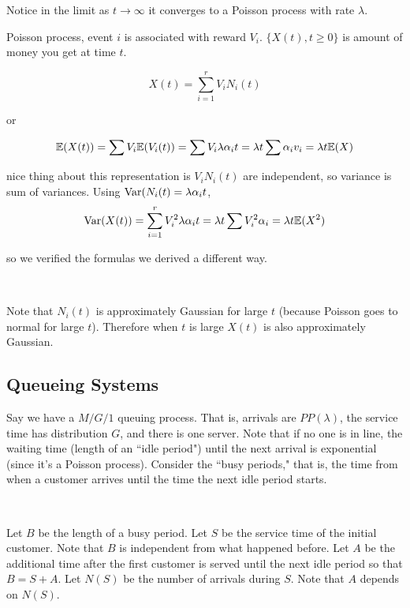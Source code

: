 \begin{remark}
Notice in the limit as \(t \to \infty\) it converges to a Poisson process with rate \(\lambda\).
\end{remark}

\begin{example}
Poisson process, event \(i\) is associated with reward \(V_i\). \(\{X(t), t \geq 0 \} \) is amount of money you get at time \(t\).

\begin{equation}
X(t) = \sum_{i=1}^r V_i N_i(t)
\end{equation}

or

\[
\mathbb{E}(X(t)) = \sum V_i \mathbb{E}(V_i (t)) = \sum V_i \lambda \alpha_i t = \lambda t \sum \alpha_i v_i = \lambda t \mathbb{E}(X)
\]

nice thing about this representation is \(V_i N_i(t)\) are independent, so variance is sum of variances. Using \(\mathrm{Var}(N_i(t) =  \lambda \alpha_i t\), 
\[
\mathrm{Var}(X(t)) = \sum_{i=1}^r V_i^2 \lambda \alpha_i t = \lambda t \sum V_i^2 \alpha_i = \lambda t \mathbb{E}(X^2)
\]

so we verified the formulas we derived a different way.

\

Note that \(N_i(t)\) is approximately Gaussian for large \(t\) (because Poisson goes to normal for large \(t\)). Therefore when \(t\) is large \(X(t)\) is also approximately Gaussian.

\end{example}

\subsection{Queueing Systems}

Say we have a \(M/G/1\) queuing process. That is, arrivals are \(PP(\lambda)\), the service time has distribution \(G\), and there is one server. Note that if no one is in line, the waiting time  (length of an ``idle period") until the next arrival is exponential (since it's a Poisson process). Consider the ``busy periods," that is, the time from when a customer arrives until the time the next idle period starts. 

\

Let \(B\) be the length of a busy period. Let \(S\) be the service time of the initial customer. Note that \(B\) is independent from what happened before. Let \(A\) be the additional time after the first customer is served until the next idle period so that \(B = S + A\). Let \(N(S)\) be the number of arrivals during \(S\). Note that \(A\) depends on \(N(S)\).

